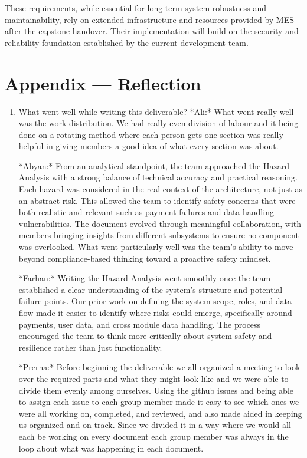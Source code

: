 \documentclass{article}
\begin{document}
These requirements, while essential for long-term system robustness and maintainability, rely on extended infrastructure and resources provided by MES after the capstone handover. Their implementation will build on the security and reliability foundation established by the current development team.


\newpage{}

\section*{Appendix --- Reflection}




\begin{enumerate}
    \item What went well while writing this deliverable? 
    *Ali:* What went really well was the work distribution. We had really even division of labour and it being done on a rotating method where each person gets one section was really helpful in giving members a good idea of what every section was about.

    *Abyan:* From an analytical standpoint, the team approached the Hazard Analysis with a strong balance of technical accuracy and practical reasoning. Each hazard was considered in the real context of the architecture, not just as an abstract risk. This allowed the team to identify safety concerns that were both realistic and relevant such as payment failures and data handling vulnerabilities. The document evolved through meaningful collaboration, with members bringing insights from different subsystems to ensure no component was overlooked. What went particularly well was the team’s ability to move beyond compliance-based thinking toward a proactive safety mindset.

    *Farhan:* Writing the Hazard Analysis went smoothly once the team established a clear understanding of the system’s structure and potential failure points. Our prior work on defining the system scope, roles, and data flow made it easier to identify where risks could emerge, specifically around payments, user data, and cross module data handling. The process encouraged the team to think more critically about system safety and resilience rather than just functionality.

    *Prerna:* Before beginning the deliverable we all organized a meeting to look over the required parts and what they might look like and we were able to divide them evenly among ourselves. Using the github issues and being able to assign each issue to each group member made it easy to see which ones we were all working on, completed, and reviewed, and also made aided in keeping us organized and on track. Since we divided it in a way where we would all each be working on every document each group member was always in the loop about what was happening in each document.


\end{enumerate}
\end{document}
